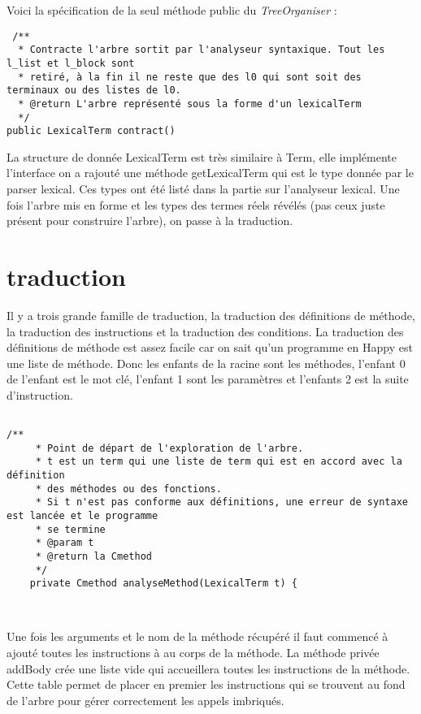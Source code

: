 

Voici la spécification de la seul méthode public du \textit{TreeOrganiser} :
\begin{verbatim}
 /**
  * Contracte l'arbre sortit par l'analyseur syntaxique. Tout les l_list et l_block sont
  * retiré, à la fin il ne reste que des l0 qui sont soit des terminaux ou des listes de l0.
  * @return L'arbre représenté sous la forme d'un lexicalTerm
  */
public LexicalTerm contract()
\end{verbatim}

La structure de donnée LexicalTerm est très similaire à Term, elle implémente l'interface on a rajouté une méthode getLexicalTerm
qui est le type donnée par le parser lexical. Ces types ont été listé dans la partie sur l'analyseur lexical. Une fois 
l'arbre mis en forme et les types des termes réels révélés (pas ceux juste présent pour construire l'arbre), on passe à la traduction.

\section{traduction}
Il y a trois grande famille de traduction, la traduction des définitions de méthode, la traduction des instructions et la traduction des conditions.
La traduction des définitions de méthode est assez facile car on sait qu'un programme en Happy est une liste de méthode. Donc les enfants
de la racine sont les méthodes, l'enfant 0 de l'enfant est le mot clé, l'enfant 1 sont les paramètres et l'enfants 2 est la suite d'instruction.
\begin{verbatim}

/**
	 * Point de départ de l'exploration de l'arbre. 
	 * t est un term qui une liste de term qui est en accord avec la définition
	 * des méthodes ou des fonctions.
	 * Si t n'est pas conforme aux définitions, une erreur de syntaxe est lancée et le programme
	 * se termine
	 * @param t 
	 * @return la Cmethod 
	 */
	private Cmethod analyseMethod(LexicalTerm t) { 

 
\end{verbatim}

Une fois les arguments et le nom de la méthode récupéré il faut commencé à ajouté toutes les instructions à au corps de la méthode.
La méthode privée addBody crée une liste vide qui accueillera toutes les instructions de la méthode. Cette table permet de placer en premier
les instructions qui se trouvent au fond de l'arbre pour gérer correctement les appels imbriqués.

